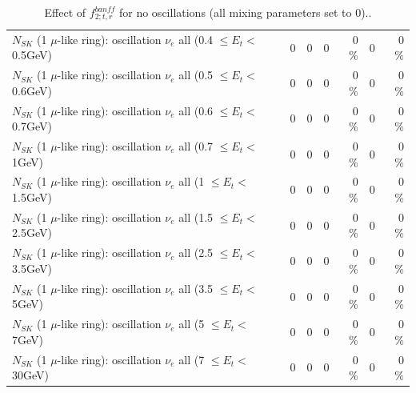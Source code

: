 \begin{table}
\begin{tabular}{| l | r | r | r  r | r  r |}
$N_{SK}$ (1 $\mu$-like ring): oscillation $\nu_{e}$ all (0.4 $\leq E_{t} <$ 0.5GeV) &               0 &               0 &               0 &        0 \%  &               0 &        0 \%  \\ 
$N_{SK}$ (1 $\mu$-like ring): oscillation $\nu_{e}$ all (0.5 $\leq E_{t} <$ 0.6GeV) &               0 &               0 &               0 &        0 \%  &               0 &        0 \%  \\ 
$N_{SK}$ (1 $\mu$-like ring): oscillation $\nu_{e}$ all (0.6 $\leq E_{t} <$ 0.7GeV) &               0 &               0 &               0 &        0 \%  &               0 &        0 \%  \\ 
$N_{SK}$ (1 $\mu$-like ring): oscillation $\nu_{e}$ all (0.7 $\leq E_{t} <$ 1GeV) &               0 &               0 &               0 &        0 \%  &               0 &        0 \%  \\ 
$N_{SK}$ (1 $\mu$-like ring): oscillation $\nu_{e}$ all (1 $\leq E_{t} <$ 1.5GeV) &               0 &               0 &               0 &        0 \%  &               0 &        0 \%  \\ 
$N_{SK}$ (1 $\mu$-like ring): oscillation $\nu_{e}$ all (1.5 $\leq E_{t} <$ 2.5GeV) &               0 &               0 &               0 &        0 \%  &               0 &        0 \%  \\ 
$N_{SK}$ (1 $\mu$-like ring): oscillation $\nu_{e}$ all (2.5 $\leq E_{t} <$ 3.5GeV) &               0 &               0 &               0 &        0 \%  &               0 &        0 \%  \\ 
$N_{SK}$ (1 $\mu$-like ring): oscillation $\nu_{e}$ all (3.5 $\leq E_{t} <$ 5GeV) &               0 &               0 &               0 &        0 \%  &               0 &        0 \%  \\ 
 $N_{SK}$ (1 $\mu$-like ring): oscillation $\nu_{e}$ all (5 $\leq E_{t} <$ 7GeV) &               0 &               0 &               0 &        0 \%  &               0 &        0 \%  \\ 
$N_{SK}$ (1 $\mu$-like ring): oscillation $\nu_{e}$ all (7 $\leq E_{t} <$ 30GeV) &               0 &               0 &               0 &        0 \%  &               0 &        0 \%  \\ 
\hline
\hline
\end{tabular}
\caption{ Effect of $f_{2; t, r}^{banff}$ for no oscillations (all mixing parameters set to 0).. }
\label{tab:num_banff_02_1RmuT_3f_osc_t13:0}
\end{table}
\clearpage
